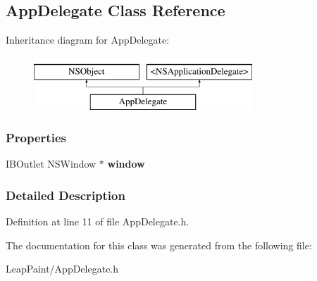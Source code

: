 \hypertarget{interface_app_delegate}{\subsection{App\-Delegate Class Reference}
\label{dd/d52/interface_app_delegate}
}
Inheritance diagram for App\-Delegate\-:\begin{figure}[H]
\begin{center}
\leavevmode
\includegraphics[height=2.000000cm]{dd/d52/interface_app_delegate}
\end{center}
\end{figure}
\subsubsection*{Properties}
\begin{DoxyCompactItemize}
\item 
\hypertarget{interface_app_delegate_acdf10c46711b4d6a8d95def15620afb6}{I\-B\-Outlet N\-S\-Window $\ast$ {\bfseries window}}\label{dd/d52/interface_app_delegate_acdf10c46711b4d6a8d95def15620afb6}

\end{DoxyCompactItemize}


\subsubsection{Detailed Description}


Definition at line 11 of file App\-Delegate.\-h.



The documentation for this class was generated from the following file\-:\begin{DoxyCompactItemize}
\item 
Leap\-Paint/App\-Delegate.\-h\end{DoxyCompactItemize}
